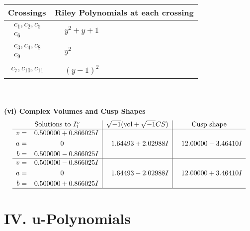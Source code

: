 \documentclass[1p]{elsarticle_modified}
\theoremstyle{definition}
\newcommand{\I}{\sqrt{-1}}
\begin{document}
\begin{tabular}{m{50pt}|m{274pt}}
Crossings & \hspace{64pt}Riley Polynomials at each crossing \\
\hline $$\begin{aligned}c_{1},c_{2},c_{5}\\c_{6}\end{aligned}$$&$\begin{aligned}
&y^2+y+1
\end{aligned}$\\
\hline $$\begin{aligned}c_{3},c_{4},c_{8}\\c_{9}\end{aligned}$$&$\begin{aligned}
&y^2
\end{aligned}$\\
\hline $$\begin{aligned}c_{7},c_{10},c_{11}\end{aligned}$$&$\begin{aligned}
&(y-1)^2
\end{aligned}$\\
\hline
\end{tabular}\\~\\
\newpage\flushleft \textbf{(vi) Complex Volumes and Cusp Shapes}
$$\begin{array}{c|c|c}  
\text{Solutions to }I^v_{1}& \I (\text{vol} + \sqrt{-1}CS) & \text{Cusp shape}\\
 \hline 
\begin{aligned}
v &= \phantom{-}0.500000 + 0.866025 I \\
a &= \phantom{-0.000000 } 0 \\
b &= \phantom{-}0.500000 - 0.866025 I\end{aligned}
 & \phantom{-}1.64493 + 2.02988 I & \phantom{-}12.00000 - 3.46410 I \\ \hline\begin{aligned}
v &= \phantom{-}0.500000 - 0.866025 I \\
a &= \phantom{-0.000000 } 0 \\
b &= \phantom{-}0.500000 + 0.866025 I\end{aligned}
 & \phantom{-}1.64493 - 2.02988 I & \phantom{-}12.00000 + 3.46410 I\\
 \hline 
 \end{array}$$\newpage
\newpage\renewcommand{\arraystretch}{1}
\centering \section*{ IV. u-Polynomials}
\end{document}
